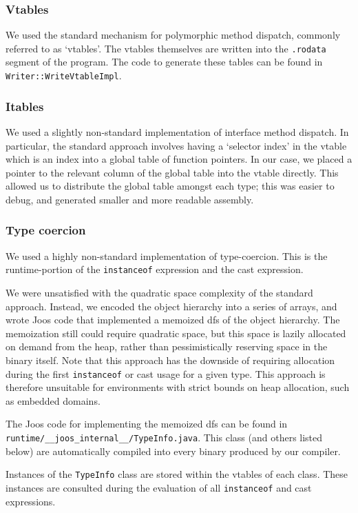 \documentclass[12pt, titlepage]{article}
\newcommand{\z}[1]{\texttt{#1}}
\begin{document}
\subsubsection{Vtables}
We used the standard mechanism for polymorphic method dispatch, commonly
referred to as `vtables'. The vtables themselves are written into the
\z{.rodata} segment of the program. The code to generate these tables can be
found in \z{Writer::WriteVtableImpl}.

\subsubsection{Itables}
We used a slightly non-standard implementation of interface method dispatch. In
particular, the standard approach involves having a `selector index' in the
vtable which is an index into a global table of function pointers. In our case,
we placed a pointer to the relevant column of the global table into the vtable
directly. This allowed us to distribute the global table amongst each type;
this was easier to debug, and generated smaller and more readable assembly.

\subsubsection{Type coercion}\label{subsubsec:co}
We used a highly non-standard implementation of type-coercion. This is the
runtime-portion of the \z{instanceof} expression and the cast expression.

We were unsatisfied with the quadratic space complexity of the standard
approach. Instead, we encoded the object hierarchy into a series of arrays, and
wrote Joos code that implemented a memoized \ac{dfs} of the object hierarchy.
The memoization still could require quadratic space, but this space is lazily
allocated on demand from the heap, rather than pessimistically reserving space
in the binary itself. Note that this approach has the downside of requiring
allocation during the first \z{instanceof} or cast usage for a given type. This
approach is therefore unsuitable for environments with strict bounds on heap
allocation, such as embedded domains.

The Joos code for implementing the memoized \ac{dfs} can be found in
\z{runtime/\_\_joos\_internal\_\_/TypeInfo.java}. This class (and others listed
below) are automatically compiled into every binary produced by our compiler.

Instances of the \z{TypeInfo} class are stored within the vtables of each
class. These instances are consulted during the evaluation of all
\z{instanceof} and cast expressions.
\end{document}
